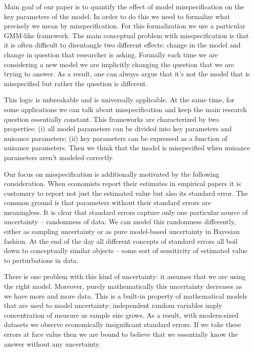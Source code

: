 \documentclass[12pt]{article}
\theoremstyle{plain}
\begin{document}
Main goal of our paper is to quantify the effect of model misspecification on the key parameters of the model. In order to do this we need to formalize what precisely we mean by misspecification. For this formalization we use a particular GMM-like framework. The main conceptual problem with misspecification is that it is often difficult to disentangle two different effects: change in the model and change in question that researcher is asking. Formally each time we are considering a new model we  are implicitly changing the question that we are trying to answer.  As a result, one can always argue that it's not the model that is misspecified but rather the question is different. 


This logic is unbreakable and is universally applicable. At the same time, for some applications we can talk about misspecification and keep the main research question essentially constant. This frameworks are characterized by two properties: (i) all model parameters can be divided into key parameters and nuisance parameters; (ii) key parameters can be expressed as a function of nuisance parameters. Then we think that the model is misspecified when nuisance parameters aren't modeled correctly. 

Our focus on misspecification is additionally motivated by the following consideration. When economists report their estimates in empirical papers it is customary to report not just the estimated value but also its standard error. The common ground is that parameters without their standard errors are meaningless. It is clear that standard errors capture only one particular source of uncertainty -- randomness of data. We can model this randomness differently, either as sampling uncertainty or as pure model-based uncertainty in Bayesian  fashion.  At the end of the day all different concepts of standard errors all boil down to conceptually similar objects -- some sort of sensitivity of estimated value to perturbations in data.

There is one problem with this kind of uncertainty: it assumes that we are using the right model. Moreover, purely mathematically this uncertainty decreases as we have more and more data. This is a built-in property of mathematical models that are used to model uncertainty: independent random variables imply  concentration of measure as sample size grows. As a result, with modern-sized datasets we observe economically insignificant standard errors. If we take these errors at face value then we are bound to believe that we essentially know the answer without any uncertainty. 
\end{document}
